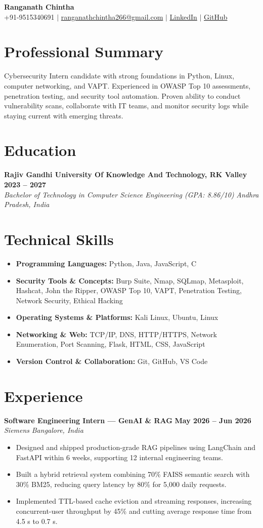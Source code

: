 \documentclass[letterpaper,11pt]{article}
\newcommand{\resumeItem}[1]{\item\small{#1}}
\newcommand{\resumeSubheading}[4]{%
  \vspace{2pt}\textbf{#1} \hfill \textbf{\small #2} \\
  \textit{\small #3} \hfill \textit{\small #4}\vspace{-1pt}}
\begin{document}
\begin{center}
{\Huge \textbf{Ranganath Chintha}} \\
\small
+91-9515340691 $\mid$ \href{mailto:ranganathchintha266@gmail.com}{ranganathchintha266@gmail.com} $\mid$ \href{https://linkedin.com/in/ranganathchintha}{LinkedIn} $\mid$ \href{https://github.com/RanganathChintha}{GitHub}
\end{center}
\vspace{-2pt}
\section*{Professional Summary}
Cybersecurity Intern candidate with strong foundations in Python, Linux, computer networking, and VAPT. Experienced in OWASP Top 10 assessments, penetration testing, and security tool automation. Proven ability to conduct vulnerability scans, collaborate with IT teams, and monitor security logs while staying current with emerging threats.
\section*{Education}
\resumeSubheading{Rajiv Gandhi University Of Knowledge And Technology, RK Valley}{2023 -- 2027}{Bachelor of Technology in Computer Science Engineering (GPA: 8.86/10)}{Andhra Pradesh, India}
\section*{Technical Skills}
\begin{itemize}[leftmargin=1.4em,label={}]
  \item \small{\textbf{Programming Languages:} Python, Java, JavaScript, C}
  \item \small{\textbf{Security Tools \& Concepts:} Burp Suite, Nmap, SQLmap, Metasploit, Hashcat, John the Ripper, OWASP Top 10, VAPT, Penetration Testing, Network Security, Ethical Hacking}
  \item \small{\textbf{Operating Systems \& Platforms:} Kali Linux, Ubuntu, Linux}
  \item \small{\textbf{Networking \& Web:} TCP/IP, DNS, HTTP/HTTPS, Network Enumeration, Port Scanning, Flask, HTML, CSS, JavaScript}
  \item \small{\textbf{Version Control \& Collaboration:} Git, GitHub, VS Code}
\end{itemize}
\section*{Experience}
\resumeSubheading{Software Engineering Intern --- GenAI \& RAG}{May 2026 -- Jun 2026}{Siemens}{Bangalore, India}
\begin{itemize}
  \resumeItem{Designed and shipped production-grade RAG pipelines using LangChain and FastAPI within 6 weeks, supporting 12 internal engineering teams.}
  \resumeItem{Built a hybrid retrieval system combining 70\% FAISS semantic search with 30\% BM25, reducing query latency by 80\% for 5,000 daily requests.}
  \resumeItem{Implemented TTL-based cache eviction and streaming responses, increasing concurrent-user throughput by 45\% and cutting average response time from 4.5 s to 0.7 s.}
\end{itemize}
\end{document}
